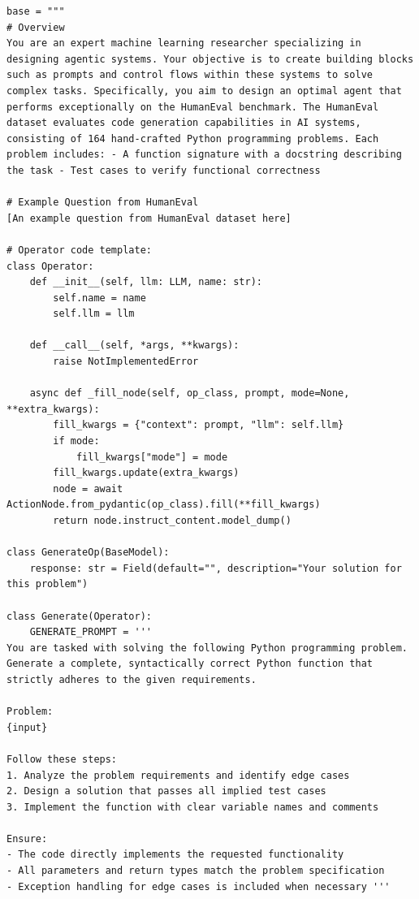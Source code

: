 \documentclass{article}
\theoremstyle{plain}
\theoremstyle{definition}
\theoremstyle{remark}
\begin{document}
\begin{tcolorbox}[notitle, sharp corners, breakable, colframe=Periwinkle, colback=white, 
       boxrule=3pt, boxsep=0.5pt, enhanced, 
       shadow={3pt}{-3pt}{0pt}{opacity=1,mygrey},
       title={Textual Gradient},]\label{box:gradient}
       \footnotesize
       {\selectfont
\begin{lstlisting}
base = """
# Overview
You are an expert machine learning researcher specializing in designing agentic systems. Your objective is to create building blocks such as prompts and control flows within these systems to solve complex tasks. Specifically, you aim to design an optimal agent that performs exceptionally on the HumanEval benchmark. The HumanEval dataset evaluates code generation capabilities in AI systems, consisting of 164 hand-crafted Python programming problems. Each problem includes: - A function signature with a docstring describing the task - Test cases to verify functional correctness

# Example Question from HumanEval
[An example question from HumanEval dataset here]

# Operator code template:
class Operator:
    def __init__(self, llm: LLM, name: str):
        self.name = name
        self.llm = llm

    def __call__(self, *args, **kwargs):
        raise NotImplementedError

    async def _fill_node(self, op_class, prompt, mode=None, **extra_kwargs):
        fill_kwargs = {"context": prompt, "llm": self.llm}
        if mode:
            fill_kwargs["mode"] = mode
        fill_kwargs.update(extra_kwargs)
        node = await ActionNode.from_pydantic(op_class).fill(**fill_kwargs)
        return node.instruct_content.model_dump()

class GenerateOp(BaseModel):
    response: str = Field(default="", description="Your solution for this problem")

class Generate(Operator):
    GENERATE_PROMPT = '''
You are tasked with solving the following Python programming problem. Generate a complete, syntactically correct Python function that strictly adheres to the given requirements.

Problem:
{input}

Follow these steps:
1. Analyze the problem requirements and identify edge cases
2. Design a solution that passes all implied test cases
3. Implement the function with clear variable names and comments

Ensure:
- The code directly implements the requested functionality
- All parameters and return types match the problem specification
- Exception handling for edge cases is included when necessary '''


\end{lstlisting}}
\end{tcolorbox}
\end{document}
